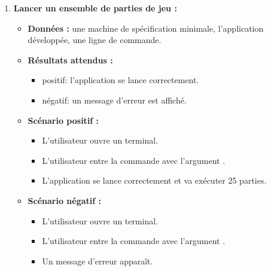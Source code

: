 \begin{enumerate}
    \item \textbf{Lancer un ensemble de parties de jeu :}
    \begin{itemize}
        \item \textbf{Données :} une machine de spécification minimale, l'application développée, une ligne de commande.
        \item \textbf{Résultats attendus :}
        \begin{itemize}
            \item positif: l'application se lance correctement. \item négatif: un message d'erreur est affiché.
        \end{itemize}
        \item \textbf{Scénario positif :}
        \begin{itemize}
            \item L’utilisateur ouvre un terminal.
            \item L’utilisateur entre la commande avec l'argument .
            \item L'application se lance correctement et va exécuter 25 parties.
        \end{itemize}
        \item \textbf{Scénario négatif :}
        \begin{itemize}
            \item L’utilisateur ouvre un terminal.
            \item L’utilisateur entre la commande avec l'argument .
            \item Un message d'erreur apparaît.
        \end{itemize}
    \end{itemize}
    

\end{enumerate}
